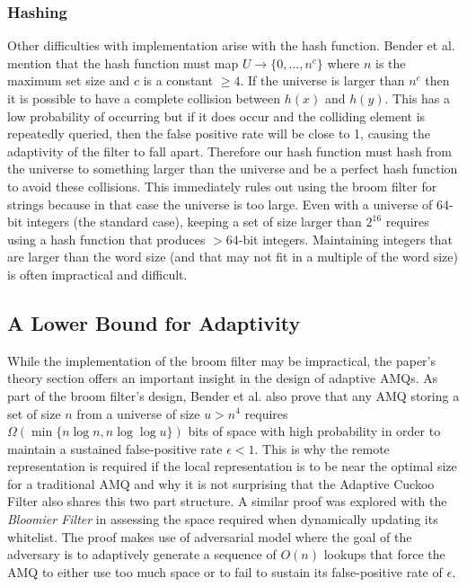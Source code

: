 \documentclass[../paper.tex]{subfiles}
\begin{document}
\subsubsection{Hashing}

Other difficulties with implementation arise with the hash function. Bender et al.
mention that the hash function must map $U \rightarrow \{0,\ldots,n^c\}$ where
$n$ is the maximum set size and $c$ is a constant $\geq 4$. If the universe
is larger than $n^c$ then it is possible to have a complete collision between
$h(x)$ and $h(y)$. This has a low probability of occurring but if it does
occur and the colliding element is repeatedly queried, then the false positive
rate will be close to 1, causing the adaptivity of the filter to fall apart. Therefore
our hash function must hash from the universe to something larger than the universe
and be a perfect hash function to avoid these collisions. This immediately rules
out using the broom filter for strings because in that case the universe is too large.
Even with a universe of 64-bit integers (the standard case), keeping a set of size
larger than $2^{16}$ requires using a hash function that produces $>64$-bit integers.
Maintaining integers that are larger than the word size (and that may not fit in a multiple
of the word size) is often impractical and difficult.

\subsection{A Lower Bound for Adaptivity} While the
implementation of the broom filter may be impractical, the paper's theory
section offers an important insight in the design of adaptive AMQs. As part of the broom filter's design,
Bender et al. also prove that any AMQ storing a set of size $n$ from a universe
of size $u > n^4$ requires $\Omega (\min \{n\log n, n\log\log u\})$ bits of
space with high probability in order to maintain a sustained false-positive
rate $\epsilon < 1$.  This is why the remote representation is required if the
local representation is to be near the optimal size for a traditional AMQ and
why it is not surprising that the Adaptive Cuckoo Filter also shares this two
part structure.  A similar proof was explored with the {\it Bloomier Filter} 
\cite{bloomier-filter} in assessing the space required when dynamically 
updating its whitelist. The proof makes use of adversarial model where the 
goal of the adversary is to adaptively generate a sequence of $O(n)$ lookups 
that force the AMQ to either use too much space or to fail to sustain its 
false-positive rate of $\epsilon$.  
	
\end{document}
